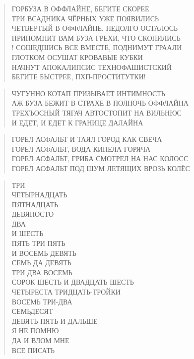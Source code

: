 \poemtitle{***}
\begin{verse}
ГОРБУЗА В ОФФЛАЙНЕ, БЕГИТЕ СКОРЕЕ\\
ТРИ ВСАДНИКА ЧЁРНЫХ УЖЕ ПОЯВИЛИСЬ\\
ЧЕТВЁРТЫЙ В ОФФЛАЙНЕ, НЕДОЛГО ОСТАЛОСЬ\\
ПРИПОМНИТ ВАМ БУЗА ГРЕХИ, ЧТО СКОПИЛИСЬ\\!
СОШЕДШИСЬ ВСЕ ВМЕСТЕ, ПОДНИМУТ ГРААЛИ\\
ГЛОТКОМ ОСУШАТ КРОВАВЫЕ КУБКИ\\
НАЧНУТ АПОКАЛИПСИС ТЕХНОФАШИСТСКИЙ\\
БЕГИТЕ БЫСТРЕЕ, ПХП-ПРОСТИТУТКИ!
\end{verse}

\poemtitle{***}
\begin{verse}
ЧУГУННО КОТАП ПРИЗЫВАЕТ ИНТИМНОСТЬ\\
АЖ БУЗА БЕЖИТ В СТРАХЕ В ПОЛНОЧЬ ОФФЛАЙНА\\
ТРЕХЪОСНЫЙ ТЯГАЧ АВТОСТОПИТ НА ВИЛЬНЮС\\
И ЕДЕТ, И ЕДЕТ К ГРАНИЦЕ ДАЛАЙНА
\end{verse}

\poemtitle{***}
\begin{verse}
ГОРЕЛ АСФАЛЬТ И ТАЯЛ ГОРОД КАК СВЕЧА\\
ГОРЕЛ АСФАЛЬТ, ВОДА КИПЕЛА ГОРЯЧА\\
ГОРЕЛ АСФАЛЬТ, ГРИБА СМОТРЕЛ НА НАС КОЛОСС\\
ГОРЕЛ АСФАЛЬТ ПОД ШУМ ЛЕТЯЩИХ ВРОЗЬ КОЛЁС
\end{verse}

\poemtitle{***}
\begin{verse}
ТРИ\\
   ЧЕТЫРНАДЦАТЬ\\
               ПЯТНАДЦАТЬ\\
ДЕВЯНОСТО\\
         ДВА\\
            И ШЕСТЬ\\
ПЯТЬ ТРИ ПЯТЬ\\
             И ВОСЕМЬ ДЕВЯТЬ\\
СЕМЬ ДА ДЕВЯТЬ\\
              ТРИ ДВА ВОСЕМЬ\\
СОРОК ШЕСТЬ И ДВАДЦАТЬ ШЕСТЬ\\
ЧЕТЫРЕСТА ТРИДЦАТЬ-ТРОЙКИ\\
ВОСЕМЬ ТРИ-ДВА\\
              СЕМЬДЕСЯТ\\
ДЕВЯТЬ ПЯТЬ И ДАЛЬШЕ\\
             Я НЕ ПОМНЮ\\
ДА И ВЛОМ МНЕ\\
             ВСЕ ПИСАТЬ
\end{verse}

